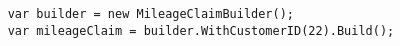 \begin{verbatim}
    var builder = new MileageClaimBuilder();
    var mileageClaim = builder.WithCustomerID(22).Build();
\end{verbatim}

